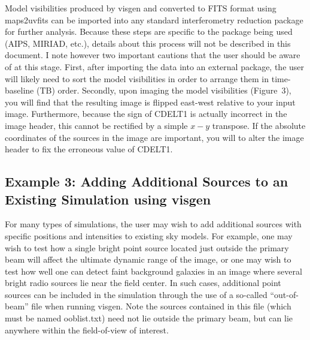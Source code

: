 \documentclass[12pt,psfig]{article}
\begin{document}

Model visibilities produced by {\sf visgen} and converted to FITS
format using {\sf maps2uvfits} can be imported into any standard
interferometry reduction package for further analysis. Because these
steps are specific to the package being used (AIPS, MIRIAD, etc.),
details about this process will not be described in this document. I
note however two important cautions that the user should be aware of
at this stage. First, after importing the data into an external
package, the user will likely need to sort the model visibilities in
order to arrange them in time-baseline (TB) order. Secondly, upon
imaging the model visibilities (Figure~3), you will find that the resulting image
is flipped east-west relative to your input image. Furthermore,
because the sign of CDELT1 is actually incorrect in the image header, this
cannot be rectified by a simple $x-y$ transpose. If the absolute
coordinates of the sources in the image are important, you will
to alter the image header to fix the erroneous
value of CDELT1.

%

\subsection{Example 3: Adding Additional Sources to an Existing Simulation 
using {\sf visgen}\protect\label{outofbeam}}
%
For many types of simulations, the user may wish to add additional 
sources with specific positions and intensities 
to existing sky models. For example,
one may wish to test how a single bright point source located just 
outside the primary
beam will affect the ultimate dynamic range of the image, or one may 
wish to test
how well one can detect faint background galaxies in
an 
image where
several bright radio sources lie near the field center. In such cases, 
additional point
sources can be included in the simulation through the use of a 
so-called
``out-of-beam'' file when running {\sf visgen}. Note the sources
contained 
in this file (which must be named {\sf ooblist.txt})
need not lie outside the primary beam, but can lie anywhere within the 
field-of-view of interest.
\end{document}
